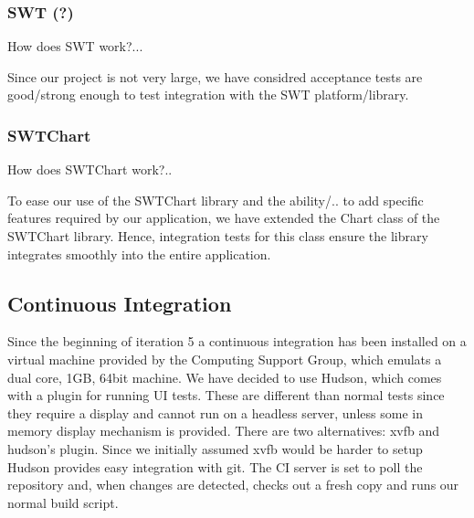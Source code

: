 \documentclass[10pt]{article}
\begin{document}
\subsubsection{SWT (?)}

How does SWT work?...

Since our project is not very large, we have considred acceptance tests are good/strong enough to test integration with the SWT platform/library.

\subsubsection{SWTChart}

How does SWTChart work?..

To ease our use of the SWTChart library and the ability/.. to add specific features required by our application, we have extended the Chart class of the SWTChart library. Hence, integration tests for this class ensure the library integrates smoothly into the entire application. 


\subsection{Continuous Integration}

Since the beginning of iteration 5 a continuous integration has been installed on a virtual machine provided by the Computing Support Group, which emulats a dual core, 1GB, 64bit machine.
We have decided to use Hudson, which comes with a plugin for running UI tests. These are different than normal tests since they require a display and cannot run on a headless server, unless some in memory display mechanism is provided. There are two alternatives: xvfb and hudson's plugin. Since we initially assumed xvfb would be harder to setup
Hudson provides easy integration with git.
The CI server is set to poll the repository and, when changes are detected, checks out a fresh copy and runs our normal build script.
\end{document}
